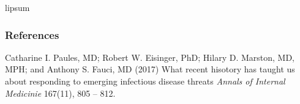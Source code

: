 \documentclass{beamer}
\begin{document}

\appendix

\begin{frame}
  lipsum
\end{frame}

\begin{frame}
  \frametitle{References}
  \footnotesize{
    \begin{thebibliography}{99} %

       Catharine I. Paules, MD; Robert W. Eisinger, PhD; Hilary D. Marston, MD, MPH; and Anthony S. Fauci, MD (2017)
      \newblock What recent hisotory has taught us about responding to emerging infectious disease threats
      \newblock \emph{Annals of Internal Medicinie} 167(11), 805 -- 812.
    \end{thebibliography}

  }

\end{frame}
\end{document}
